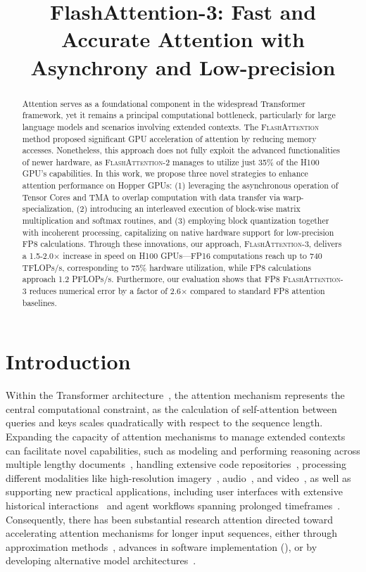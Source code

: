 \title{FlashAttention-3: Fast and Accurate Attention with Asynchrony and Low-precision}

\begin{abstract}
Attention serves as a foundational component in the widespread Transformer framework, yet it remains a principal computational bottleneck, particularly for large language models and scenarios involving extended contexts. The \textsc{FlashAttention} method proposed significant GPU acceleration of attention by reducing memory accesses. Nonetheless, this approach does not fully exploit the advanced functionalities of newer hardware, as \textsc{FlashAttention-2} manages to utilize just 35\% of the H100 GPU’s capabilities. In this work, we propose three novel strategies to enhance attention performance on Hopper GPUs: (1) leveraging the asynchronous operation of Tensor Cores and TMA to overlap computation with data transfer via warp-specialization, (2) introducing an interleaved execution of block-wise matrix multiplication and softmax routines, and (3) employing block quantization together with incoherent processing, capitalizing on native hardware support for low-precision FP8 calculations. Through these innovations, our approach, \textsc{FlashAttention-3}, delivers a 1.5-2.0$\times$ increase in speed on H100 GPUs—FP16 computations reach up to 740 TFLOPs/s, corresponding to 75\% hardware utilization, while FP8 calculations approach 1.2 PFLOPs/s. Furthermore, our evaluation shows that FP8 \textsc{FlashAttention-3} reduces numerical error by a factor of 2.6$\times$ compared to standard FP8 attention baselines.
\end{abstract}

\section{Introduction}
\label{sec:intro}

Within the Transformer architecture~\citep{vaswani2017attention}, the attention mechanism represents the central computational constraint, as the calculation of self-attention between queries and keys scales quadratically with respect to the sequence length. Expanding the capacity of attention mechanisms to manage extended contexts can facilitate novel capabilities, such as modeling and performing reasoning across multiple lengthy documents~\citep{guo2021longt5,shaham2022scrolls,peng2023yarn}, handling extensive code repositories~\citep{roziere2023code, li2023starcoder}, processing different modalities like high-resolution imagery~\citep{chen2022scaling}, audio~\citep{gulati2020conformer}, and video~\citep{ho2022video}, as well as supporting new practical applications, including user interfaces with extensive historical interactions~\citep{sun2019bert4rec} and agent workflows spanning prolonged timeframes~\citep{yao2022react}. Consequently, there has been substantial research attention directed toward accelerating attention mechanisms for longer input sequences, either through approximation methods~\citep{katharopoulos2020transformers,choromanski2020rethinking,
tay2020efficient}, advances in software implementation (\citep{rabe2021self,dao2022flashattention,kwon2023efficient}), or by developing alternative model architectures~\citep{peng2023rwkv,sun2023retentive,gu2023mamba}.

